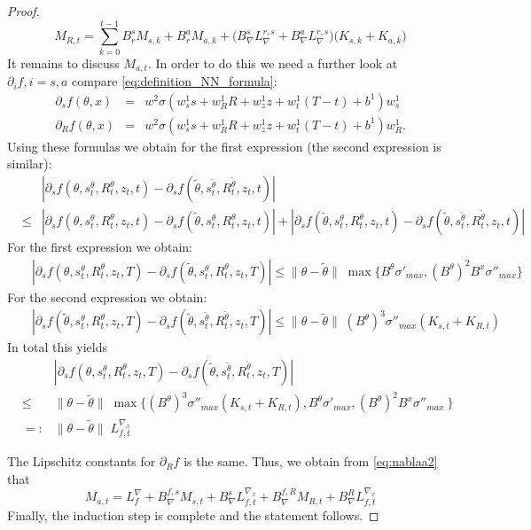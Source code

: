 \documentclass[reqno, 11pt]{amsart}%
\theoremstyle{definition}
\begin{document}
\begin{proof}
$$M_{R,t} = \sum_{k=0}^{t-1} B_r^s M_{s,k} + B_r^a M_{a,k} + \big( B_\nabla^s L_\nabla^{r,s}+B_\nabla^a L_\nabla^{r,s} \big)\big(K_{s,k}+K_{a,k} \big)$$
It remains to discuss $M_{a,t}.$ In order to do this we need a further look at $\partial_if, i=s,a$ compare \eqref{eq:definition_NN_formula}:
\begin{eqnarray*}
    \partial_sf(\theta,x) &=& w^2 \sigma(w^1_s s + w^1_R R+ w^1_z z + w^1_t (T-t)+ b^1) w^1_s\\ 
    \partial_Rf(\theta,x) &=& w^2 \sigma(w^1_s s + w^1_R R+ w^1_z z + w^1_t (T-t)+ b^1) w^1_R.
\end{eqnarray*}
Using these formulas we obtain for the first expression (the second expression is similar):
\begin{eqnarray*}
  &&  |\partial_sf(\theta,s_t^\theta,R_t^\theta,z_t,t)-\partial_sf(\tilde\theta,s_t^{\tilde\theta},R_t^{\tilde\theta},z_t,t)| \\
&\le& |\partial_sf(\theta,s_t^\theta,R_t^\theta,z_t,t)-\partial_sf(\tilde\theta,s_t^{\theta},R_t^{\theta},z_t,t)| + |\partial_sf(\tilde\theta,s_t^\theta,R_t^\theta,z_t,t)-\partial_sf(\tilde\theta,s_t^{\tilde\theta},R_t^{\tilde\theta},z_t,t)|
\end{eqnarray*}
For the first expression we obtain:
\begin{eqnarray*}
  &&  |\partial_sf(\theta,s_t^\theta,R_t^\theta,z_t,T)-\partial_sf(\tilde\theta,s_t^{\theta},R_t^{\theta},z_t,T)| \le  \|\theta-\tilde\theta\|\;  \max\{B^\theta \sigma'_{max}, (B^\theta)^2B^x \sigma''_{max}  \}
\end{eqnarray*}
For the second expression we obtain:
\begin{eqnarray*}
  &&  |\partial_sf(\tilde\theta,s_t^\theta,R_t^\theta,z_t,T)-\partial_sf(\tilde\theta,s_t^{\tilde\theta},R_t^{\tilde\theta},z_t,T)| \le  \|\theta-\tilde\theta\|\;   (B^\theta)^3 \sigma''_{max} (K_{s,t}+K_{R,t})
\end{eqnarray*}
In total this yields 
\begin{eqnarray*}
  &&  |\partial_sf(\theta,s_t^\theta,R_t^\theta,z_t,T)-\partial_sf(\tilde\theta,s_t^{\tilde\theta},R_t^{\tilde\theta},z_t,T)| \\
&\le& \|\theta-\tilde\theta\|\; \max\{(B^\theta)^3 \sigma''_{max} (K_{s,t}+K_{R,t}), B^\theta \sigma'_{max}, (B^\theta)^2B^x \sigma''_{max} \  \}\\
&=:& \|\theta-\tilde\theta\|\;  L_{f,t} ^{\nabla_x} 
\end{eqnarray*}

The Lipschitz constants for $\partial_Rf$ is the same.
Thus, we obtain from \eqref{eq:nablaa2} that
$$ M_{a,t} = L_f^\nabla+ B_\nabla^{f,s} M_{s,t} + B_\nabla^s L_{f,t} ^{\nabla_x} +
 B_\nabla^{f,R} M_{R,t} + B_\nabla^R L_{f,t} ^{\nabla_x} $$
Finally, the induction step is complete and the statement follows.
\end{proof}
\end{document}
